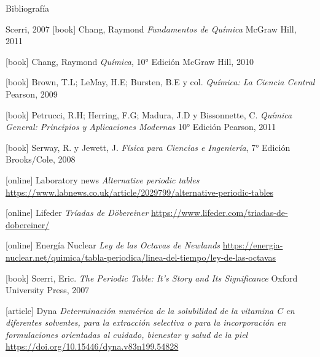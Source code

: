 \documentclass[11pt, aspectratio=169, xcolor=table]{beamer}
\begin{document}
\begin{frame}[allowframebreaks]{Bibliografía}
  \begin{thebibliography}{Scerri, 2007}
    \footnotesize
    [book]
    Chang, Raymond
    \newblock \emph{Fundamentos de Química}
    \newblock McGraw Hill, 2011

    [book]
    Chang, Raymond
    \newblock \emph{Química}, 10° Edición
    \newblock McGraw Hill, 2010

    [book]
    Brown, T.L; LeMay, H.E; Bursten, B.E y col.
    \newblock \emph{Química: La Ciencia Central}
    \newblock Pearson, 2009

    [book]
    Petrucci, R.H; Herring, F.G; Madura, J.D y Bissonnette, C.
    \newblock \emph{Química General: Principios y Aplicaciones Modernas} 10° Edición
    \newblock Pearson, 2011

    [book]
    Serway, R. y Jewett, J.
    \newblock \emph{Física para Ciencias e Ingeniería}, 7° Edición
    \newblock Brooks/Cole, 2008

    [online]
    Laboratory news
    \newblock \emph{Alternative periodic tables}
    \newblock \url{https://www.labnews.co.uk/article/2029799/alternative-periodic-tables}

    [online]
    Lifeder
    \newblock \emph{Tríadas de Döbereiner}
    \newblock \url{https://www.lifeder.com/triadas-de-dobereiner/}

    [online]
    Energía Nuclear
    \newblock \emph{Ley de las Octavas de Newlands}
    \newblock \url{https://energia-nuclear.net/quimica/tabla-periodica/linea-del-tiempo/ley-de-las-octavas}

    [book]
    Scerri, Eric.
    \newblock \emph{The Periodic Table: It's Story and Its Significance}
    \newblock Oxford University Press, 2007

    [article]
    Dyna
    \newblock \emph{Determinación numérica de la solubilidad de la vitamina C en diferentes solventes, para la extracción selectiva o para la incorporación en formulaciones orientadas al cuidado, bienestar y salud de la piel}
    \newblock \url{https://doi.org/10.15446/dyna.v83n199.54828}


\end{thebibliography}
\end{frame}
\end{document}

